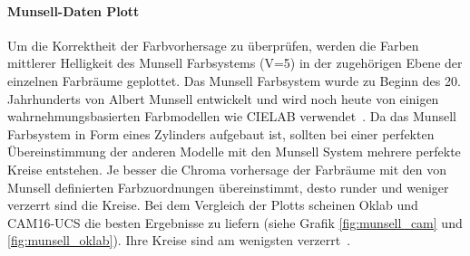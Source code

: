 \documentclass[12pt, a4paper, ngerman]{article}
\begin{document}
\paragraph{Munsell-Daten Plott}
Um die Korrektheit der Farbvorhersage zu überprüfen, werden die Farben mittlerer Helligkeit des Munsell Farbsystems (V=5) 
in der zugehörigen Ebene der einzelnen Farbräume geplottet. 
Das Munsell Farbsystem wurde zu Beginn des 20. Jahrhunderts von Albert Munsell entwickelt und 
wird noch heute von einigen wahrnehmungsbasierten Farbmodellen wie CIELAB verwendet~\cite{Munsell_color_system_2022}.
Da das Munsell Farbsystem in Form eines Zylinders aufgebaut ist, 
sollten bei einer perfekten Übereinstimmung der anderen Modelle mit den Munsell System mehrere perfekte Kreise entstehen.
Je besser die Chroma vorhersage der Farbräume mit den von Munsell definierten Farbzuordnungen übereinstimmt, 
desto runder und weniger verzerrt sind die Kreise. Bei dem Vergleich der Plotts scheinen Oklab und CAM16-UCS die besten Ergebnisse zu liefern (siehe Grafik \ref{fig:munsell_cam} und \ref{fig:munsell_oklab}). 
Ihre Kreise sind am wenigsten verzerrt~\cite{Oklab_2020}.
\end{document}
